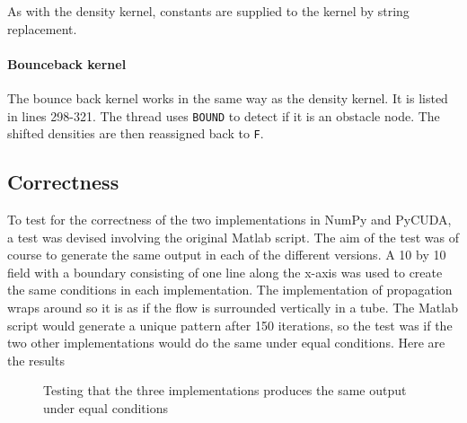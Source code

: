 As with the density kernel, constants are supplied to the kernel by string replacement.


\paragraph{Bounceback kernel}
The bounce back kernel works in the same way as the density kernel. It is listed in  lines 298-321. The thread uses \texttt{BOUND} to detect if it is an obstacle node. The shifted densities are then reassigned back to \texttt{F}.




\subsection{Correctness}
To test for the correctness of the two implementations in NumPy and PyCUDA, a test was devised involving the original Matlab script. The aim of the test was of course to generate the same output in each of the different versions. A 10 by 10 field with a boundary consisting of one line along the x-axis was used to create the same conditions in each implementation. The implementation of propagation wraps around so it is as if the flow is surrounded vertically in a tube. The Matlab script would generate a unique pattern after 150 iterations, so the test was if the two other implementations would do the same under equal conditions. Here are the results

\begin{figure}[H]
\centering
{}
\hspace{1pt}
\caption{Testing that the three implementations produces the same output under equal conditions}
\label{correctness}
\end{figure}


